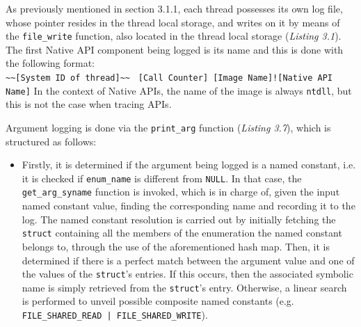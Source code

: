 As previously mentioned in section 3.1.1, each thread possesses its own log file, whose pointer resides in the thread local storage, and writes on it by means of the \texttt{file\_write} function, also located in the thread local storage (\textit{Listing 3.1}). The first Native API component being logged is its name and this is done with the following format:
\\ 
\texttt{\textasciitilde\textasciitilde[System ID of thread]\textasciitilde\textasciitilde} \texttt{ [Call Counter] [Image Name]![Native API Name]}  
In the context of Native APIs, the name of the image is always \texttt{ntdll}, but this is not the case when tracing APIs.

Argument logging is done via the \texttt{print\_arg} function (\textit{Listing 3.7}), which is structured as follows:

\begin{itemize}
\item Firstly, it is determined if the argument being logged is a named constant, i.e. it is checked if \texttt{enum\_name} is different from \texttt{NULL}. In that case, the \texttt{get\_arg\_syname} function is invoked, which is in charge of, given the input named constant value, finding the corresponding name and recording it to the log. The named constant resolution is carried out by initially fetching the \texttt{struct} containing all the members of the enumeration the named constant belongs to, through the use of the aforementioned hash map. Then, it is determined if there is a perfect match between the argument value and one of the values of the \texttt{struct}'s entries. If this occurs, then the associated symbolic name is simply retrieved from the \texttt{struct}'s entry. Otherwise, a linear search is performed to unveil possible composite named constants (e.g. \texttt{FILE\_SHARED\_READ | FILE\_SHARED\_WRITE}).    

\end{itemize}

